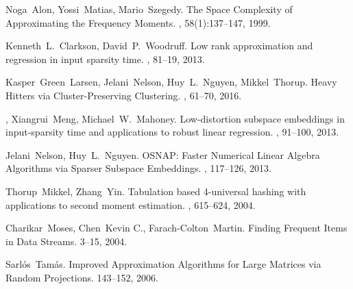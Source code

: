 \documentclass[11pt]{article}
\begin{document}
\begin{thebibliography}{42}

Noga~Alon, Yossi~Matias, Mario~Szegedy.
\newblock The Space Complexity of Approximating the Frequency Moments.
, 58(1):137--147, 1999.

Kenneth~L.~Clarkson, David~P.~Woodruff.
\newblock Low rank approximation and regression in input sparsity time.
, 81--19, 2013.

Kasper~Green~Larsen, Jelani~Nelson, Huy~L.~Nguyen, Mikkel~Thorup.
\newblock Heavy Hitters via Cluster-Preserving Clustering.
, 61--70, 2016.

,
Xiangrui~Meng, Michael~W.~Mahoney.
\newblock Low-distortion subspace embeddings in input-sparsity time and applications to robust linear regression.
, 91--100, 2013.

Jelani~Nelson, Huy~L.~Nguyen.
\newblock OSNAP: Faster Numerical Linear Algebra Algorithms via Sparser Subspace Embeddings.
, 117--126, 2013.

Thorup~Mikkel, Zhang~Yin.
\newblock Tabulation based 4-universal hashing with applications to second moment estimation.
, 615--624, 2004. 

Charikar~Moses, Chen~Kevin C., Farach-Colton~Martin.
\newblock Finding Frequent Items in Data Streams. 
 3--15, 2004.

Sarl{\'{o}}s~Tam{\'{a}}s.
\newblock Improved Approximation Algorithms for Large Matrices via Random Projections.
 143--152, 2006.


\end{thebibliography}
\end{document}
